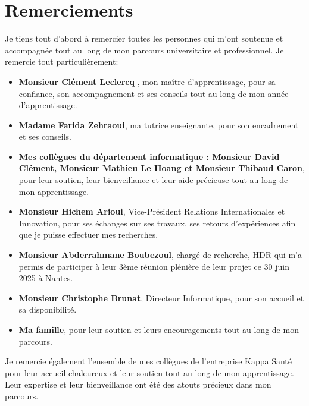 \section{Remerciements}
Je tiens tout d'abord à remercier toutes les personnes qui m'ont soutenue et accompagnée tout au long de mon parcours universitaire et professionnel. 
Je remercie tout particulièrement: \
\begin{itemize}
    \item \textbf{Monsieur Clément Leclercq }, mon maître d'apprentissage, pour sa confiance, son accompagnement et ses conseils tout au long de mon année d'apprentissage.
    \item \textbf{Madame Farida Zehraoui}, ma tutrice enseignante, pour son encadrement et ses conseils.
     \item \textbf{Mes collègues du département informatique : Monsieur David Clément, Monsieur Mathieu Le Hoang et Monsieur Thibaud Caron}, pour leur soutien, leur bienveillance et leur aide précieuse tout au long de mon apprentissage.
    \item \textbf{Monsieur Hichem Arioui}, Vice-Président Relations Internationales et Innovation, pour ses échanges sur ses travaux, ses retours d'expériences afin que je puisse effectuer mes recherches.
    \item \textbf{Monsieur Abderrahmane Boubezoul}, chargé de recherche, HDR qui m'a permis de participer à leur 3ème réunion plénière de leur projet ce 30 juin 2025 à Nantes.
    \item \textbf{Monsieur Christophe Brunat}, Directeur Informatique, pour son accueil et sa disponibilité.
    \item \textbf{Ma famille}, pour leur soutien et leurs encouragements tout au long de mon parcours.
\end{itemize}
Je remercie également l'ensemble de mes collègues de l'entreprise Kappa Santé pour leur accueil chaleureux et leur soutien tout au long de mon apprentissage. Leur expertise et leur bienveillance ont été des atouts précieux dans mon parcours.